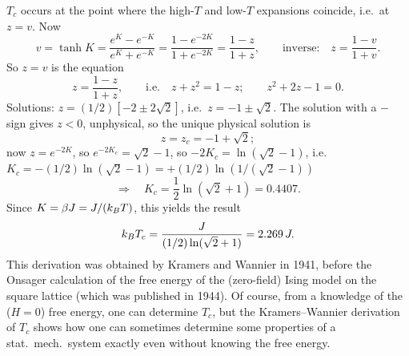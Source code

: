 \begin{diagram}
\end{diagram}

$T_c$ occurs at the point where the high-$T$ and low-$T$ expansions coincide, i.e.\ at $z = v$. Now
\begin{equation}
  v = \tanh K = \frac{e^K-e^{-K}}{e^K+e^{-K}} = \frac{1-e^{-2K}}{1+e^{-2K}} = \frac{1-z}{1+z},
  \qquad\text{inverse:}\quad z = \frac{1-v}{1+v}.
\end{equation}
So $z = v$ is the equation
\begin{equation}
  z = \frac{1-z}{1+z},\qquad\text{i.e.}\quad z+z^2 = 1-z;\qquad z^2+2z-1 = 0 .
\end{equation}
Solutions: $z = (1/2)\left[-2\pm 2\sqrt2\right]$, i.e.\ $z = -1\pm\sqrt2$. The solution with a $-$
sign gives $z<0$, unphysical, so the unique physical solution is
\begin{equation}
  z = z_c = -1+\sqrt2 ;
\end{equation}
now $z = e^{-2K}$, so $e^{-2K_c} = \sqrt2-1$, so $-2K_c = \ln(\sqrt2-1)$, i.e.\
$K_c = -(1/2)\ln(\sqrt2-1) = +(1/2)\ln\left(1/(\sqrt2-1)\right)$
\begin{equation}
  \Rightarrow\quad K_c = \frac{1}{2}\ln(\sqrt2+1) = 0.4407 .
\end{equation}
Since $K = \beta J = J/(k_{B} T)$, this yields the result
\begin{equation}
  k_{B} T_c = \frac{J}{(1/2)\ln(\sqrt2+1)} = 2.269\,J .
\end{equation}
This derivation was obtained by Kramers and Wannier in 1941, before the Onsager calculation of the
free energy of the (zero-field) Ising model on the square lattice (which was published in 1944). Of
course, from a knowledge of the ($H = 0$) free energy, one can determine $T_c$, but the
Kramers--Wannier derivation of $T_c$ shows how one can sometimes determine some properties of a
stat.\ mech.\ system exactly even without knowing the free energy.
